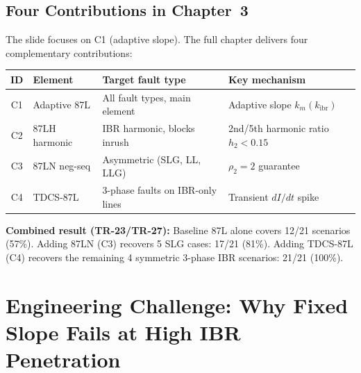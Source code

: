 \documentclass[12pt,a4paper]{article}
\newcommand{\kibr}{k_\mathrm{ibr}}
\newcommand{\km}{k_m}
\begin{document}
\subsection{Four Contributions in Chapter~3}

The slide focuses on C1 (adaptive slope). The full chapter delivers four complementary contributions:

\begin{center}
\begin{tabular}{@{}clll@{}}
\toprule
\textbf{ID} & \textbf{Element} & \textbf{Target fault type} & \textbf{Key mechanism} \\
\midrule
C1 & Adaptive 87L  & All fault types, main element & Adaptive slope $\km(\kibr)$ \\
C2 & 87LH harmonic & IBR harmonic, blocks inrush  & 2nd/5th harmonic ratio $h_2 < 0.15$ \\
C3 & 87LN neg-seq  & Asymmetric (SLG, LL, LLG)   & $\rho_2 = 2$ guarantee \\
C4 & TDCS-87L      & 3-phase faults on IBR-only lines & Transient $dI/dt$ spike \\
\bottomrule
\end{tabular}
\end{center}

\textbf{Combined result (TR-23/TR-27):} Baseline 87L alone covers 12/21 scenarios (57\%). Adding 87LN (C3) recovers 5 SLG cases: 17/21 (81\%). Adding TDCS-87L (C4) recovers the remaining 4 symmetric 3-phase IBR scenarios: 21/21 (100\%).

\section{Engineering Challenge: Why Fixed Slope Fails at High IBR Penetration}
\end{document}
